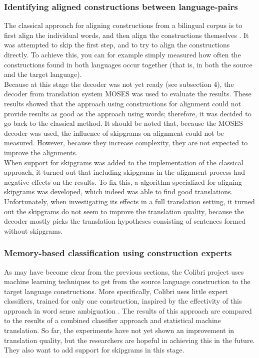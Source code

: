 \documentclass[12pt]{article}
\begin{document}
\subsubsection{Identifying aligned constructions between language-pairs}
The classical approach for aligning constructions from a bilingual corpus is to first align the individual words, and then align the constructions themselves \citep{koehn03}. It was attempted to skip the first step, and to try to align the constructions directly. To achieve this, you can for example simply measured how often the constructions found in both languages occur together (that is, in both the source and the target language).\\\indent
Because at this stage the decoder was not yet ready (see subsection 4), the decoder from translation system MOSES was used to evaluate the results. These results showed that the approach using constructions for alignment could not provide results as good as the approach using words; therefore, it was decided to go back to the classical method. It should be noted that, because the MOSES decoder was used, the influence of skipgrams on alignment could not be measured. However, because they increase complexity, they are not expected to improve the alignments.\\\indent
When support for skipgrams was added to the implementation of the classical approach, it turned out that including skipgrams in the alignment process had negative effects on the results. To fix this, a algorithm specialized for aligning skipgrams was developed, which indeed was able to find good translations. Unfortunately, when investigating its effects in a full translation setting, it turned out the skipgrams do not seem to improve the translation quality, because the decoder mostly picks the translation hypotheses consisting of sentences formed without skipgrams.

\subsubsection{Memory-based classification using construction experts}
As may have become clear from the previous sections, the Colibri project uses machine learning techniques to get from the source language construction to the target language constructions. More specifically, Colibri uses little expert classifiers, trained for only one construction, inspired by the effectivity of this approach in word sense ambiguation \citep{vangompel10}. The results of this approach are compared to the results of a combined classifier approach and statistical machine translation. So far, the experiments have not yet shown an improvement in translation quality, but the researchers are hopeful in achieving this in the future. They also want to add support for skipgrams in this stage.
\end{document}
